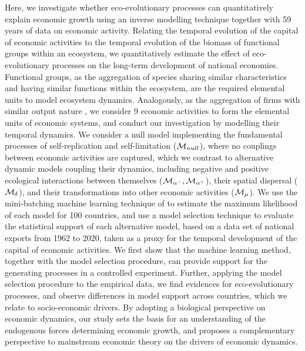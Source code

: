   Here, we investigate whether eco-evolutionary processes can quantitatively explain economic growth using an inverse modelling technique together with 59 years of data on economic activity. Relating the temporal evolution of the capital of economic activities to the temporal evolution of the biomass of functional groups within an ecosystem, we quantitatively estimate the effect of eco-evolutionary processes on the long-term development of national economies.
  Functional groups, as the aggregation of species sharing similar characteristics and having similar functions within the ecosystem, are the required elemental units to model ecosystem dynamics. Analogously, as the aggregation of firms with similar output nature \citep{Applegate2021}, we consider 9 economic activities to form the elemental units of economic systems, and conduct our investigation by modelling their temporal dynamics.
  We consider a null model implementing the fundamental processes of self-replication and self-limitation ($\mathcal{M}_{null}$), where no couplings between economic activities are captured, which we contrast to alternative dynamic models coupling their dynamics, including negative and positive ecological interactions between themselves ($\mathcal{M}_{\alpha^-},\mathcal{M}_{\alpha^+}$), their spatial dispersal ($\mathcal{M}_\delta$), and their transformations into other economic activities ($\mathcal{M}_\mu$).
  We use the mini-batching machine learning technique of \cite{Boussange2022a} to estimate the maximum likelihood of each model for 100 countries, and use a model selection technique to evaluate the statistical support of each alternative model, based on a data set of national exports from 1962 to 2020, taken as a proxy for the temporal development of the capital of economic activities. 
  We first show that the machine learning method, together with the model selection procedure, can provide support for the generating processes in a controlled experiment.
  Further, applying the model selection procedure to the empirical data, we find evidences for eco-evolutionary processes, and observe differences in model support across countries, which we relate to socio-economic drivers. 
  By adopting a biological perspective on economic dynamics, our study sets the basis for an understanding of the endogenous forces determining economic growth, and proposes a complementary perspective to mainstream economic theory on the drivers of economic dynamics.

